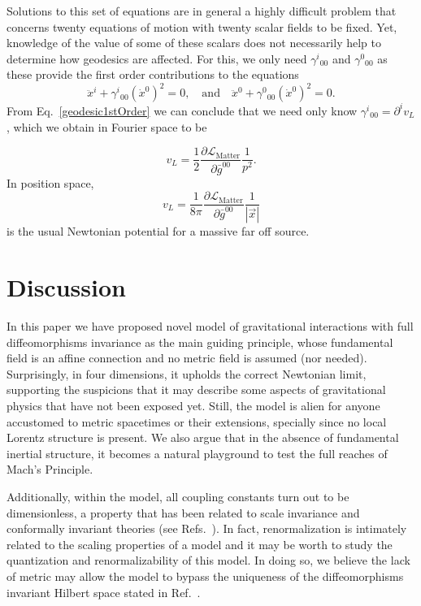 \documentclass[twocolumn,aps,
  showpacs,showkeys,prd,superscriptaddress]{revtex4-1}
\renewcommand{\(}{\left(}
\renewcommand{\)}{\right)}
\renewcommand{\[}{\left[}
\renewcommand{\]}{\right]}
\begin{document}
Solutions to this set of equations are in general a highly difficult problem that concerns twenty equations of motion with twenty scalar fields to be fixed. Yet, knowledge of the value of some of these scalars does not necessarily help to determine how geodesics are affected. For this, we only need $\gamma^i{}_{00}$ and $\gamma^0{}_{00}$ as these provide the first order contributions to the equations
\begin{equation}
  \label{geodesic1stOrder}
  \ddot{x}^i + \gamma^i{}_{00}(\dot{x}^0)^2 = 0,
  \quad \text{and} \quad
  \ddot{x}^0 + \gamma^0{}_{00}(\dot{x}^0)^2 = 0.
\end{equation}
From Eq.~\eqref{geodesic1stOrder} we can conclude that we need only know $\gamma^i{}_{00} = \partial^i v_L$, which we obtain in Fourier space to be

\begin{equation}
  v_L=\frac{1}{2}\frac{\partial\mathcal{L}_{\text{Matter}}}{\partial\bar{g}^{00}}\frac{1}{p^2}.
\end{equation}
In position space, 
\begin{equation}
  v_L = \frac{1}{8\pi} \frac{ \partial\mathcal{L}_{\text{Matter}} }{ \partial \bar{g}^{00} } \frac{1}{|\vec{x}|}
\end{equation}
is the usual Newtonian potential for a massive far off source.


\section{\label{sec:dis} Discussion}

In this paper we have proposed novel model of gravitational interactions with full diffeomorphisms invariance as the main guiding principle, whose fundamental field is an affine connection and no metric field is assumed (nor needed). Surprisingly, in four dimensions, it upholds the correct Newtonian limit, supporting the suspicions that it may describe some aspects of gravitational physics that have not been exposed yet. Still, the model is alien for anyone accustomed to metric spacetimes or their extensions, specially since no local Lorentz structure is present. We also argue that in the absence of fundamental inertial structure, it becomes a natural playground to test the full reaches of Mach's Principle.

Additionally, within the model, all coupling constants turn out to be dimensionless, a property that has been related to scale invariance and conformally invariant theories (see Refs.~\cite{Buchholz:1976hz,Maldacena:2011mk}). In fact, renormalization is intimately related to the scaling properties of a model and it may be worth to study the quantization and renormalizability of this  model. In doing so, we believe the lack of metric may allow the model to bypass the uniqueness of the diffeomorphisms invariant Hilbert space stated in Ref.~\cite{Lewandowski:2005jk}.
\end{document}
